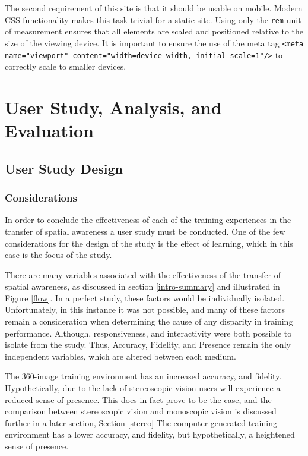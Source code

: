 \documentclass[ %
                    author={Elis Jones},
                supervisor={Dr. Kirsten Cater},
                    degree={BSc},
                     title={The Effect of Presentation Medium on Spatial Cognition},
                  subtitle={in the Virtual Environment},
                      year={2018} ]{dissertation}
\begin{document}
The second requirement of this site is that it should be usable on mobile. Modern CSS functionality makes this task trivial for a static site. Using only the \lstinline{rem} unit of measurement ensures that all elements are scaled and positioned relative to the size of the viewing device. It is important to ensure the use of the meta tag \lstinline{<meta name="viewport" content="width=device-width, initial-scale=1"/>} to correctly scale to smaller devices. 






















\chapter{User Study, Analysis, and Evaluation}\label{user-study-chapter}

\section{User Study Design}

\subsection{Considerations}
In order to conclude the effectiveness of each of the training experiences in the transfer of spatial awareness a user study must be conducted. One of the few considerations for the design of the study is the effect of learning, which in this case is the focus of the study.

There are many variables associated with the effectiveness of the transfer of spatial awareness, as discussed in section \ref{intro-summary} and illustrated in Figure \ref{flow}. In a perfect study, these factors would be individually isolated. Unfortunately, in this instance it was not possible, and many of these factors remain a consideration when determining the cause of any disparity in training performance. Although, responsiveness, and interactivity were both possible to isolate from the study. Thus, Accuracy, Fidelity, and Presence remain the only independent variables, which are altered between each medium. 

The 360-image training environment has an increased accuracy, and fidelity. Hypothetically, due to the lack of stereoscopic vision users will experience a reduced sense of presence. This does in fact prove to be the case, and the comparison between stereoscopic vision and monoscopic vision is discussed further in a later section, Section \ref{stereo}
The computer-generated training environment has a lower accuracy, and fidelity, but hypothetically, a heightened sense of presence. 
\end{document}
